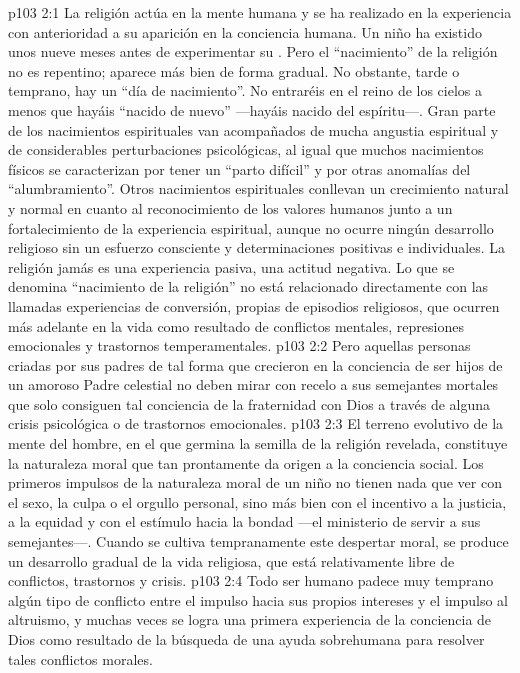 \vs p103 2:1 La religión actúa en la mente humana y se ha realizado en la experiencia con anterioridad a su aparición en la conciencia humana. Un niño ha existido unos nueve meses antes de experimentar su . Pero el “nacimiento” de la religión no es repentino; aparece más bien de forma gradual. No obstante, tarde o temprano, hay un “día de nacimiento”. No entraréis en el reino de los cielos a menos que hayáis “nacido de nuevo” ---hayáis nacido del espíritu---. Gran parte de los nacimientos espirituales van acompañados de mucha angustia espiritual y de considerables perturbaciones psicológicas, al igual que muchos nacimientos físicos se caracterizan por tener un “parto difícil” y por otras anomalías del “alumbramiento”. Otros nacimientos espirituales conllevan un crecimiento natural y normal en cuanto al reconocimiento de los valores humanos junto a un fortalecimiento de la experiencia espiritual, aunque no ocurre ningún desarrollo religioso sin un esfuerzo consciente y determinaciones positivas e individuales. La religión jamás es una experiencia pasiva, una actitud negativa. Lo que se denomina “nacimiento de la religión” no está relacionado directamente con las llamadas experiencias de conversión, propias de episodios religiosos, que ocurren más adelante en la vida como resultado de conflictos mentales, represiones emocionales y trastornos temperamentales.
\vs p103 2:2 Pero aquellas personas criadas por sus padres de tal forma que crecieron en la conciencia de ser hijos de un amoroso Padre celestial no deben mirar con recelo a sus semejantes mortales que solo consiguen tal conciencia de la fraternidad con Dios a través de alguna crisis psicológica o de trastornos emocionales.
\vs p103 2:3 El terreno evolutivo de la mente del hombre, en el que germina la semilla de la religión revelada, constituye la naturaleza moral que tan prontamente da origen a la conciencia social. Los primeros impulsos de la naturaleza moral de un niño no tienen nada que ver con el sexo, la culpa o el orgullo personal, sino más bien con el incentivo a la justicia, a la equidad y con el estímulo hacia la bondad ---el ministerio de servir a sus semejantes---. Cuando se cultiva tempranamente este despertar moral, se produce un desarrollo gradual de la vida religiosa, que está relativamente libre de conflictos, trastornos y crisis.
\vs p103 2:4 Todo ser humano padece muy temprano algún tipo de conflicto entre el impulso hacia sus propios intereses y el impulso al altruismo, y muchas veces se logra una primera experiencia de la conciencia de Dios como resultado de la búsqueda de una ayuda sobrehumana para resolver tales conflictos morales.
